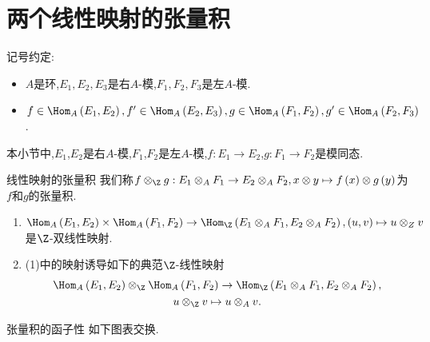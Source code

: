 \section{两个线性映射的张量积}

记号约定:

\begin{itemize}
	\item $A$是环,$E_{1},E_{2},E_{3}$是右$A$-模,$F_{1},F_{2},F_{3}$是左$A$-模.
	\item $f\in\Hom_{A}\left(E_{1},E_{2}\right),f^{\prime}\in\Hom_{A}\left(E_{2},E_{3}\right),g\in\Hom_{A}\left(F_{1},F_{2}\right),g^{\prime}\in\Hom_{A}\left(F_{2},F_{3}\right)$.
\end{itemize}

本小节中,$E_{1}$,$E_{2}$是右$A$-模,$F_{1}$,$F_{2}$是左$A$-模,$f:E_{1}\to E_{2}$,$g:F_{1}\to F_{2}$是模同态.

\begin{definition}{线性映射的张量积}{}
	我们称$f\otimes_{\Z}g:E_{1}\otimes_{A}F_{1}\to E_{2}\otimes_{A}F_{2},x\otimes y\mapsto f\left(x\right)\otimes g\left(y\right)$为$f$和$g$的张量积.
\end{definition}

\begin{proposition}{}{}
	\begin{enumerate}
		\item $\Hom_{A}\left(E_{1},E_{2}\right)\times\Hom_{A}\left(F_{1},F_{2}\right)\to\Hom_{\Z}\left(E_{1}\otimes_{A}F_{1},E_{2}\otimes_{A}F_{2}\right),\left(u,v\right)\mapsto u\otimes_{Z}v$是$\Z$-双线性映射.
		\item (1)中的映射诱导如下的典范$\Z$-线性映射
		\begin{gather*}
			\Hom_{A}\left(E_{1},E_{2}\right)\otimes_{\Z}\Hom_{A}\left(F_{1},F_{2}\right)\to\Hom_{\Z}\left(E_{1}\otimes_{A}F_{1},E_{2}\otimes_{A}F_{2}\right),\\
			u\otimes_{\Z}v\mapsto u\otimes_{A}v.
		\end{gather*}
	\end{enumerate}
\end{proposition}

\begin{proposition}{张量积的函子性}{}
	如下图表交换.
	\begin{center}
	\end{center}
\end{proposition}
